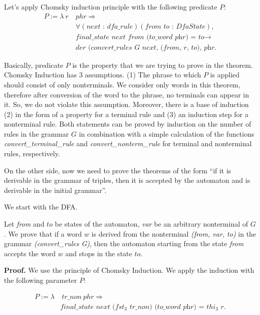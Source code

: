 Let's apply Chomsky induction principle with the following predicate $P$:
\begin{align*}
  P :=  \lambda \ r \ & phr \Rightarrow \\
        &\forall (\textit{next : dfa\_rule}) (\textit{from to : DfaState}), \\
        &\textit{final\_state next from (to\_word phr) = to} \to \\
        &\textit{der (convert\_rules G next, (from, r, to), phr}.
\end{align*}

Basically, predicate $P$ is the property that we are trying to prove in the theorem. Chomsky Induction has 3 assumptions.
(1) The phrase to which $P$ is applied should consist of only nonterminals. We consider only words in this theorem, therefore after conversion of the word to the phrase, no terminals can appear in it. So, we do not violate this assumption.
Moreover, there is a base of induction (2) in the form of a property for a terminal rule and (3) an induction step for a nonterminal rule.
Both statements can be proved by induction on the number of rules in the grammar $G$ in combination with a simple calculation of the functions \textit{convert\_terminal\_rule} and \textit{convert\_nonterm\_rule} for terminal and nonterminal rules, respectively.

On the other side, now we need to prove the theorems of the form  ``if it is derivable in the grammar of triples, then it is accepted by the automaton and is derivable in the initial grammar''.

We start with the DFA.

\begin{theorem}
	Let \textit{from} and $to$ be states of the automaton, \textit{var} be an arbitrary nonterminal of $G$. We prove that if a word $w$ is derived from the nonterminal \textit{(from, var, to)} in the grammar \textit{(convert\_rules G)}, then the automaton starting from the state \textit{from} accepts the word $w$ and stops in the state $to$.
\end{theorem}

\textbf{Proof.} 
We use the principle of Chomsky Induction.
We apply the induction with the following parameter $P$:

\begin{align*}
P :=  \lambda & \ \textit{tr\_non} \ phr \Rightarrow  \\
              & \textit{final\_state} \textit{\ next \ ($fst_3$ tr\_non) (to\_word \ phr) = $thi_3$ r}. 
\end{align*}

